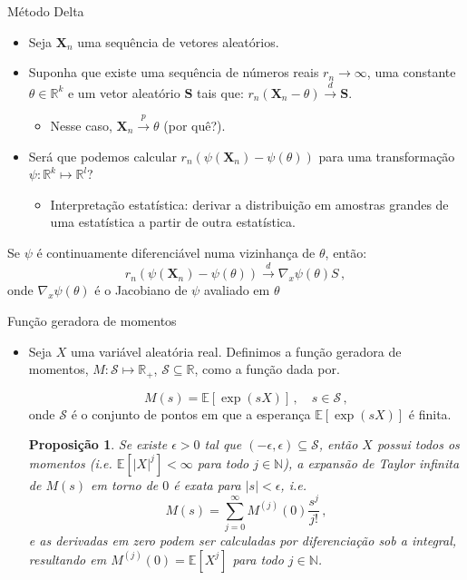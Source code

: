 \documentclass[11pt]{beamer}
\newtheorem{proposition}{Proposição}
\begin{document}
	\begin{frame}{Método Delta}

	\begin{itemize}
		\item Seja $\boldsymbol{X}_n$ uma sequência de vetores aleatórios. 
		\item Suponha que existe uma sequência de números reais $r_n \to \infty$, uma constante $\theta \in \mathbb{R}^k$ e um vetor aleatório $\boldsymbol{S}$ tais que: $r_n(\boldsymbol{X}_n-\theta) \overset{d}{\to}\boldsymbol{S}$.
		\begin{itemize}
			\item Nesse caso, $\boldsymbol{X}_n \overset{p}{\to} \theta$ (por quê?).
		\end{itemize}
		\item Será que podemos calcular $r_n(\psi(\boldsymbol{X}_n)-\psi(\theta))$ para uma transformação $\psi:\mathbb{R}^k \mapsto \mathbb{R}^l$?
		\begin{itemize}
			\item Interpretação estatística: derivar a distribuição em amostras grandes de uma estatística a partir de outra estatística.
		\end{itemize}
	\end{itemize}
	\begin{lemma}
	Se $\psi$ é continuamente diferenciável numa vizinhança de $\theta$, então:
	$$r_n(\psi(\boldsymbol{X}_n)-\psi(\theta)) \overset{d}{\to} \nabla_{x}\psi(\theta) S\, ,$$
	onde $\nabla_{x}\psi(\theta)$ é o Jacobiano de $\psi$ avaliado em $\theta$
	\end{lemma}
	\end{frame}
	\begin{frame}{Função geradora de momentos}
		\begin{itemize}
			\item Seja $X$ uma variável aleatória real. Definimos a função geradora de momentos, $M: \mathcal{S} \mapsto \mathbb{R}_+$, $\mathcal{S}\subseteq \mathbb{R}$, como a função dada por.
			
			$$M(s) = \mathbb{E}[\exp(sX)]\, ,\quad  s \in \mathcal{S}\, ,$$
			onde  $\mathcal{S}$ é o conjunto de pontos em que a esperança $ \mathbb{E}[\exp(sX)]$ é finita.

			
			\begin{proposition}
				Se existe $\epsilon > 0$ tal que $(-\epsilon,\epsilon)\subseteq\mathcal{S}$, então $X$ possui todos os momentos (i.e. $\mathbb{E}[|X|^j] < \infty$ para todo $j \in \mathbb{N}$), a expansão de Taylor infinita de $M(s)$ em torno de $0$ é exata para $|s|<\epsilon$, i.e.
				$$M(s) = \sum_{j=0}^\infty  M^{(j)}(0) \frac{s^j}{j!} \,,$$
				e as derivadas em zero podem ser calculadas por diferenciação sob a integral, resultando em $M^{(j)}(0) = \mathbb{E}[X^j]$ para todo $j \in \mathbb{N}$.
			\end{proposition}
		\end{itemize}
	\end{frame}
\end{document}
